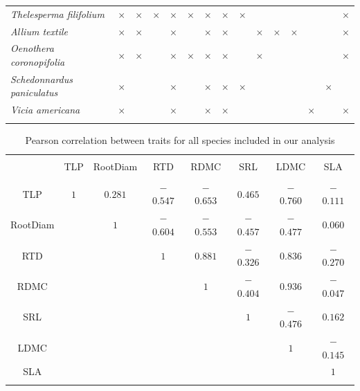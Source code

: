 \documentclass[12pt, letterpaper]{article}
\begin{document}
\begin{table}[h]
{\begin{tabular} {lccccccc|ccccc|cc}
\textit{Thelesperma filifolium} & $\times$ & $\times$ & $\times$ & $\times$ & $\times$ & $\times$ & $\times$ & $\times$ &&&&&&$\times$\\ 
\rowcolor[gray]{.95}\textit{Allium textile} & $\times$ & $\times$ &  & $\times$ &  & $\times$ & $\times$ &  & $\times$ &$\times$&$\times$&&&$\times$\\ 
\textit{Oenothera coronopifolia} & $\times$ & $\times$ &  & $\times$ & $\times$ & $\times$ & $\times$ & &$\times$ &&&&&$\times$\\ 
\rowcolor[gray]{.95}\textit{Schedonnardus paniculatus} & $\times$ &  & & $\times$ &  & $\times$ & $\times$ & $\times$ &&&&&$\times$&\\ 
\textit{Vicia americana} & $\times$ & & & $\times$ & & $\times$ & $\times$ & &&&&$\times$&&$\times$\\
\hline \\[-1.8ex] 
\end{tabular}}
\end{table}

\begin{table}[h] \centering 
  \caption{Pearson correlation between traits for all species included in our analysis} 
  \label{allSppCorr}
\begin{tabular} {cccccccc} 
\\[-1.8ex]\hline 
\hline \\[-1.8ex] 
 & TLP & RootDiam & RTD & RDMC & SRL & LDMC & SLA \\ 
\hline \\[-1.8ex] 
\rowcolor[gray]{.95}TLP & $1$ & $0.281$ & $-$ $0.547$ & $-$ $0.653$ & $0.465$ & $-$ $0.760$ & $-$ $0.111$ \\ 
RootDiam &  & $1$ & $-$ $0.604$ & $-$ $0.553$ & $-$ $0.457$ & $-$ $0.477$ & $0.060$ \\ 
\rowcolor[gray]{.95}RTD& &  & $1$ & $0.881$ & $-$ $0.326$ & $0.836$ & $-$ $0.270$ \\ 
RDMC& & &  & $1$ & $-$ $0.404$ & $0.936$ & $-$ $0.047$ \\ 
\rowcolor[gray]{.95}SRL &  & &  & & $1$ & $-$ $0.476$ & $0.162$ \\ 
LDMC & &  & &  &  & $1$ & $-$ $0.145$ \\ 
\rowcolor[gray]{.95}SLA &  & & & & & & $1$ \\ 
\hline \\[-1.8ex] 
\end{tabular} 
\end{table}
\end{document}
